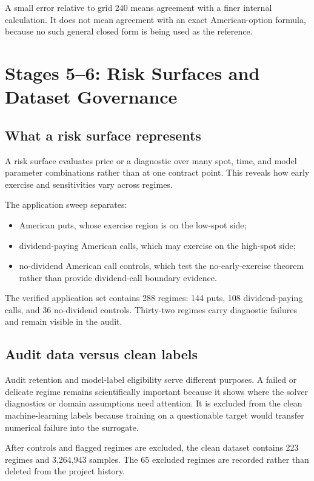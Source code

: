\begin{commonconfusion}
A small error relative to grid 240 means agreement with a finer internal
calculation. It does not mean agreement with an exact American-option formula,
because no such general closed form is being used as the reference.
\end{commonconfusion}

\section{Stages 5--6: Risk Surfaces and Dataset Governance}

\subsection{What a risk surface represents}
A risk surface evaluates price or a diagnostic over many spot, time, and model
parameter combinations rather than at one contract point. This reveals how
early exercise and sensitivities vary across regimes.

The application sweep separates:
\begin{itemize}
  \item American puts, whose exercise region is on the low-spot side;
  \item dividend-paying American calls, which may exercise on the high-spot
        side;
  \item no-dividend American call controls, which test the no-early-exercise
        theorem rather than provide dividend-call boundary evidence.
\end{itemize}
The verified application set contains 288 regimes: 144 puts, 108
dividend-paying calls, and 36 no-dividend controls. Thirty-two regimes carry
diagnostic failures and remain visible in the audit.

\subsection{Audit data versus clean labels}
Audit retention and model-label eligibility serve different purposes. A failed
or delicate regime remains scientifically important because it shows where the
solver diagnostics or domain assumptions need attention. It is excluded from
the clean machine-learning labels because training on a questionable target
would transfer numerical failure into the surrogate.

After controls and flagged regimes are excluded, the clean dataset contains
223 regimes and 3,264,943 samples. The 65 excluded regimes are recorded rather
than deleted from the project history.


